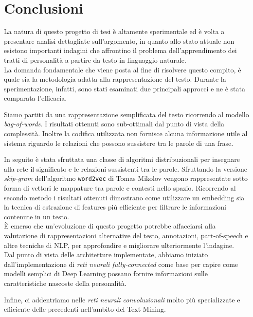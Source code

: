\chapter{Conclusioni}
\label{chap:conclusioni}

La natura di questo progetto di tesi è altamente sperimentale ed è volta a presentare analisi dettagliate sull'argomento, in quanto allo stato attuale non esistono importanti indagini che affrontino il problema dell'apprendimento dei tratti di personalità a partire da testo in linguaggio naturale.
\\

La domanda fondamentale che viene posta al fine di risolvere questo compito, è quale sia la metodologia adatta alla rappresentazione del testo.
Durante la sperimentazione, infatti, sono stati esaminati due principali approcci e ne è stata comparata l'efficacia.

Siamo partiti da una rappresentazione semplificata del testo ricorrendo al modello \emph{bag-of-words}. 
I risultati ottenuti sono sub-ottimali dal punto di vista della complessità. Inoltre la codifica utilizzata non fornisce alcuna informazione utile al sistema riguardo le relazioni che possono sussistere tra le parole di una frase.

In seguito è stata sfruttata una classe di algoritmi distribuzionali per insegnare alla rete il significato e le relazioni sussistenti tra le parole. Sfruttando la versione \emph{skip-gram} dell'algoritmo \texttt{word2vec} di Tomas Mikolov vengono rappresentate sotto forma di vettori le mappature tra parole e contesti nello spazio. 
Ricorrendo al secondo metodo i risultati ottenuti dimostrano come utilizzare un embedding sia la tecnica di estrazione di features più efficiente per filtrare le informazioni contenute in un testo.\\

È emerso che un'evoluzione di questo progetto potrebbe affacciarsi alla valutazione di rappresentazioni alternative del testo, annotazioni, part-of-speech e altre tecniche di NLP, per approfondire e migliorare ulteriormente l'indagine.\\

Dal punto di vista delle architetture implementate, abbiamo iniziato dall'implementazione di \emph{reti neurali fully-connected} come base per capire come modelli semplici di Deep Learning possano fornire informazioni sulle caratteristiche nascoste della personalità. 

Infine, ci addentriamo nelle \emph{reti neurali convoluzionali} molto più specializzate e efficiente delle precedenti nell'ambito del Text Mining.

